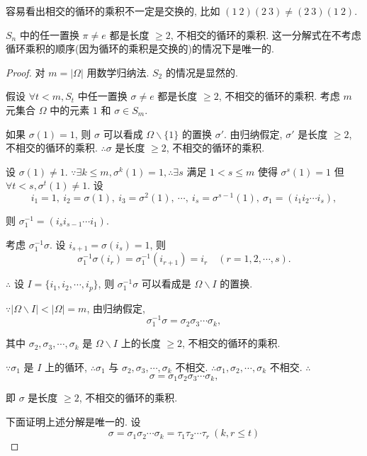 \documentclass{ctexart}
\begin{document}
容易看出相交的循环的乘积不一定是交换的, 比如 $(1\ 2)(2\ 3)\neq(2\ 3)(1\ 2)$.
\begin{theorem}[书上的定理1]
    $S_n$ 中的任一置换 $\pi\neq e$ 都是长度 $\geq2$, 不相交的循环的乘积. 这一分解式在不考虑循环乘积的顺序(因为循环的乘积是交换的)的情况下是唯一的. 
\end{theorem}
\begin{proof}
    对 $m=|\Omega|$ 用数学归纳法. $S_2$ 的情况是显然的.

    假设 $\forall t<m,S_{t}$ 中任一置换 $\sigma\neq e$ 都是长度 $\geq2$, 不相交的循环的乘积. 考虑 $m$ 元集合 $\Omega$ 中的元素 $1$ 和 $\sigma\in S_m$.

    如果 $\sigma(1)=1$, 则 $\sigma$ 可以看成 $\Omega\backslash\{1\}$ 的置换 $\sigma'$. 由归纳假定, $\sigma'$ 是长度 $\geq2$, 不相交的循环的乘积. $\therefore\sigma$ 是长度 $\geq2$, 不相交的循环的乘积.

    设 $\sigma(1)\neq1$. $\because\exists k\leq m,\sigma^k(1)=1,\therefore\exists s$ 满足 $1<s\leq m$ 使得 $\sigma^s(1)=1$ 但 $\forall t<s,\sigma^t(1)\neq1$. 设
    \[i_1=1,\ i_2=\sigma(1),\ i_3=\sigma^2(1),\ \cdots,\ i_s=\sigma^{s-1}(1),\ \sigma_1=(i_1i_2\cdots i_s),\]
    
    则 $\sigma^{-1}_1=(i_si_{s-1}\cdots i_1)$.

    考虑 $\sigma_1^{-1}\sigma$. 设 $i_{s+1}=\sigma(i_s)=1$, 则
    \[\sigma_1^{-1}\sigma(i_r)=\sigma_1^{-1}(i_{r+1})=i_r\quad(r=1,2,\cdots,s).\]

    $\therefore$ 设 $I=\{i_1,i_2,\cdots,i_p\}$, 则 $\sigma_1^{-1}\sigma$ 可以看成是 $\Omega\backslash I$ 的置换.

    $\because|\Omega\backslash I|<|\Omega|=m$, 由归纳假定,
    \[\sigma_1^{-1}\sigma=\sigma_2\sigma_3\cdots\sigma_k,\]

    其中 $\sigma_2,\sigma_3,\cdots,\sigma_k$ 是 $\Omega\backslash I$ 上的长度 $\geq2$, 不相交的循环的乘积.

    $\because\sigma_1$ 是 $I$ 上的循环, $\therefore\sigma_1$ 与 $\sigma_2,\sigma_3,\cdots,\sigma_k$ 不相交. $\therefore\sigma_1,\sigma_2,\cdots,\sigma_k$ 不相交. $\therefore$
    \[\sigma=\sigma_1\sigma_2\sigma_3\cdots\sigma_k,\]

    即 $\sigma$ 是长度 $\geq2$, 不相交的循环的乘积.

    下面证明上述分解是唯一的. 设
    \begin{equation}\label{eq1.1}
        \sigma=\sigma_1\sigma_2\cdots\sigma_k=\tau_1\tau_2\cdots\tau_r\ (k,r\leq t)
    \end{equation}


\end{proof}
\end{document}
